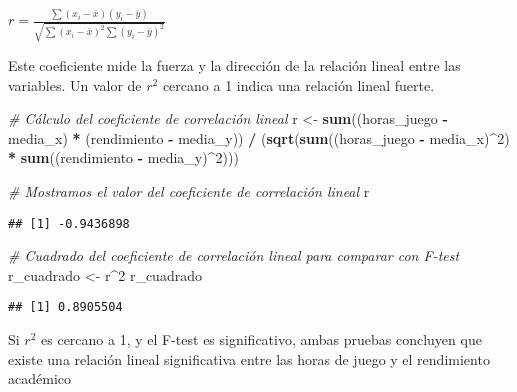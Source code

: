 \documentclass[
]{article}
\newenvironment{Shaded}{\begin{snugshade}}{\end{snugshade}}
\newcommand{\CommentTok}[1]{\textcolor[rgb]{0.56,0.35,0.01}{\textit{#1}}}
\newcommand{\DecValTok}[1]{\textcolor[rgb]{0.00,0.00,0.81}{#1}}
\newcommand{\FunctionTok}[1]{\textcolor[rgb]{0.13,0.29,0.53}{\textbf{#1}}}
\newcommand{\NormalTok}[1]{#1}
\newcommand{\OtherTok}[1]{\textcolor[rgb]{0.56,0.35,0.01}{#1}}
\newcommand{\SpecialCharTok}[1]{\textcolor[rgb]{0.81,0.36,0.00}{\textbf{#1}}}
\begin{document}
\(r = \frac{\sum{(x_i - \bar{x})(y_i - \bar{y})}}{\sqrt{\sum{(x_i - \bar{x})^2}\sum{(y_i - \bar{y})^2}}}\)

Este coeficiente mide la fuerza y la dirección de la relación lineal
entre las variables. Un valor de \(r^2\) cercano a 1 indica una relación
lineal fuerte.

\begin{Shaded}
\begin{Highlighting}[]
\CommentTok{\# Cálculo del coeficiente de correlación lineal}
\NormalTok{r }\OtherTok{\textless{}{-}} \FunctionTok{sum}\NormalTok{((horas\_juego }\SpecialCharTok{{-}}\NormalTok{ media\_x) }\SpecialCharTok{*}\NormalTok{ (rendimiento }\SpecialCharTok{{-}}\NormalTok{ media\_y)) }\SpecialCharTok{/} 
\NormalTok{     (}\FunctionTok{sqrt}\NormalTok{(}\FunctionTok{sum}\NormalTok{((horas\_juego }\SpecialCharTok{{-}}\NormalTok{ media\_x)}\SpecialCharTok{\^{}}\DecValTok{2}\NormalTok{) }\SpecialCharTok{*} \FunctionTok{sum}\NormalTok{((rendimiento }\SpecialCharTok{{-}}\NormalTok{ media\_y)}\SpecialCharTok{\^{}}\DecValTok{2}\NormalTok{)))}

\CommentTok{\# Mostramos el valor del coeficiente de correlación lineal}
\NormalTok{r}
\end{Highlighting}
\end{Shaded}

\begin{verbatim}
## [1] -0.9436898
\end{verbatim}

\begin{Shaded}
\begin{Highlighting}[]
\CommentTok{\# Cuadrado del coeficiente de correlación lineal para comparar con F{-}test}
\NormalTok{r\_cuadrado }\OtherTok{\textless{}{-}}\NormalTok{ r}\SpecialCharTok{\^{}}\DecValTok{2}
\NormalTok{r\_cuadrado}
\end{Highlighting}
\end{Shaded}

\begin{verbatim}
## [1] 0.8905504
\end{verbatim}

Si \(r^2\) es cercano a 1, y el F-test es significativo, ambas pruebas
concluyen que existe una relación lineal significativa entre las horas
de juego y el rendimiento académico
\end{document}
